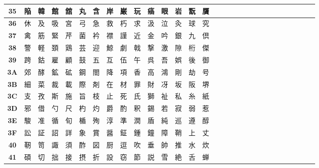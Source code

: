 \begin{table}[H]
\begin{tabular}{|Sc|Sc|Sc|Sc|Sc|Sc|Sc|Sc|Sc|Sc|Sc|Sc|Sc|Sc|Sc|}
\textbf{35} & 陥 & 韓 & 館 & 舘 & 丸 & 含 & 岸 & 巌 & 玩 & 癌 & 眼 & 岩 & 翫 & 贋 \\ \hline
\textbf{36} & 休 & 及 & 吸 & 宮 & 弓 & 急 & 救 & 朽 & 求 & 汲 & 泣 & 灸 & 球 & 究 \\ \hline
\textbf{37} & 禽 & 筋 & 緊 & 芹 & 菌 & 衿 & 襟 & 謹 & 近 & 金 & 吟 & 銀 & 九 & 倶 \\ \hline
\textbf{38} & 警 & 軽 & 頚 & 鶏 & 芸 & 迎 & 鯨 & 劇 & 戟 & 撃 & 激 & 隙 & 桁 & 傑 \\ \hline
\textbf{39} & 跨 & 鈷 & 雇 & 顧 & 鼓 & 五 & 互 & 伍 & 午 & 呉 & 吾 & 娯 & 後 & 御 \\ \hline
\textbf{3A} & 郊 & 酵 & 鉱 & 砿 & 鋼 & 閤 & 降 & 項 & 香 & 高 & 鴻 & 剛 & 劫 & 号 \\ \hline
\textbf{3B} & 細 & 菜 & 裁 & 載 & 際 & 剤 & 在 & 材 & 罪 & 財 & 冴 & 坂 & 阪 & 堺 \\ \hline
\textbf{3C} & 支 & 孜 & 斯 & 施 & 旨 & 枝 & 止 & 死 & 氏 & 獅 & 祉 & 私 & 糸 & 紙 \\ \hline
\textbf{3D} & 邪 & 借 & 勺 & 尺 & 杓 & 灼 & 爵 & 酌 & 釈 & 錫 & 若 & 寂 & 弱 & 惹 \\ \hline
\textbf{3E} & 駿 & 准 & 循 & 旬 & 楯 & 殉 & 淳 & 準 & 潤 & 盾 & 純 & 巡 & 遵 & 醇 \\ \hline
\textbf{3F} & 訟 & 証 & 詔 & 詳 & 象 & 賞 & 醤 & 鉦 & 鍾 & 鐘 & 障 & 鞘 & 上 & 丈 \\ \hline
\textbf{40} & 靭 & 笥 & 諏 & 須 & 酢 & 図 & 厨 & 逗 & 吹 & 垂 & 帥 & 推 & 水 & 炊 \\ \hline
\textbf{41} & 碩 & 切 & 拙 & 接 & 摂 & 折 & 設 & 窃 & 節 & 説 & 雪 & 絶 & 舌 & 蝉 \\ \hline
\end{tabular}
\end{table}

